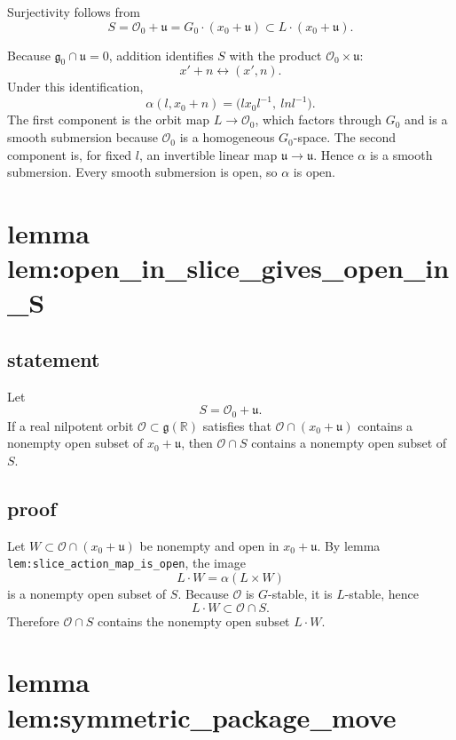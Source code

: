 \documentclass[
]{article}
\begin{document}
Surjectivity follows from \[
S=\mathcal O_0+\mathfrak u=G_0\cdot(x_0+\mathfrak u)\subset L\cdot(x_0+\mathfrak u).
\]

Because \(\mathfrak g_0\cap \mathfrak u=0\), addition identifies \(S\)
with the product \(\mathcal O_0\times \mathfrak u\): \[
x'+n\longleftrightarrow (x',n).
\] Under this identification, \[
\alpha(l,x_0+n)=\bigl(lx_0l^{-1},\ lnl^{-1}\bigr).
\] The first component is the orbit map \(L\to \mathcal O_0\), which
factors through \(G_0\) and is a smooth submersion because
\(\mathcal O_0\) is a homogeneous \(G_0\)-space. The second component
is, for fixed \(l\), an invertible linear map
\(\mathfrak u\to\mathfrak u\). Hence \(\alpha\) is a smooth submersion.
Every smooth submersion is open, so \(\alpha\) is open.

\section{lemma
lem:open\_in\_slice\_gives\_open\_in\_S}\label{lemma-lemopen_in_slice_gives_open_in_s}

\subsection{statement}\label{statement-5}

Let \[
S=\mathcal O_0+\mathfrak u.
\] If a real nilpotent orbit
\(\mathcal O\subset \mathfrak g(\mathbb R)\) satisfies that
\(\mathcal O\cap (x_0+\mathfrak u)\) contains a nonempty open subset of
\(x_0+\mathfrak u\), then \(\mathcal O\cap S\) contains a nonempty open
subset of \(S\).

\subsection{proof}\label{proof-5}

Let \(W\subset \mathcal O\cap(x_0+\mathfrak u)\) be nonempty and open in
\(x_0+\mathfrak u\). By lemma \texttt{lem:slice\_action\_map\_is\_open},
the image \[
L\cdot W=\alpha(L\times W)
\] is a nonempty open subset of \(S\). Because \(\mathcal O\) is
\(G\)-stable, it is \(L\)-stable, hence \[
L\cdot W\subset \mathcal O\cap S.
\] Therefore \(\mathcal O\cap S\) contains the nonempty open subset
\(L\cdot W\).

\section{lemma
lem:symmetric\_package\_move}\label{lemma-lemsymmetric_package_move}
\end{document}
